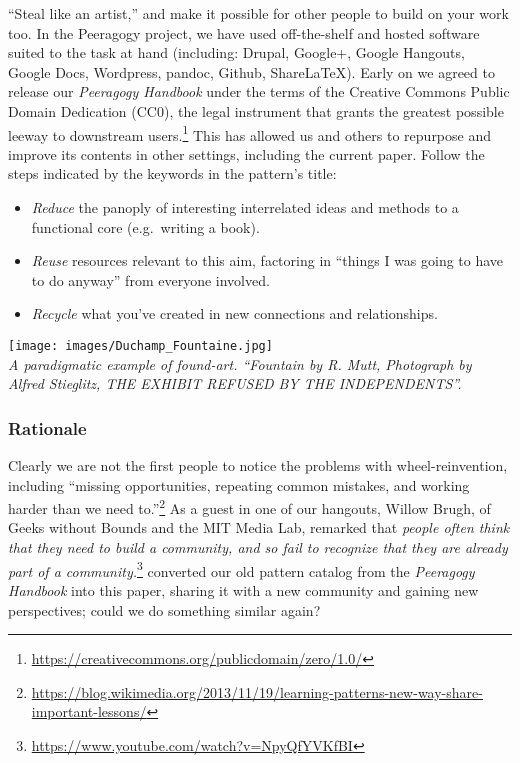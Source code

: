``Steal like an artist,'' and make it possible for other people to build
on your work too. In the Peeragogy project, we have used off-the-shelf
and hosted software suited to the task at hand (including: Drupal,
Google+, Google Hangouts, Google Docs, Wordpress, pandoc, Github,
ShareLaTeX). Early on we agreed to release our \emph{Peeragogy Handbook}
under the terms of the Creative Commons Public Domain Dedication (CC0),
the legal instrument that grants the greatest possible leeway to
downstream users.\footnote{\url{https://creativecommons.org/publicdomain/zero/1.0/}}
This has allowed us and others to repurpose and improve its contents in
other settings, including the current paper. Follow the steps indicated
by the keywords in the pattern's title:

\begin{itemize}
\tightlist
\item
  \emph{Reduce} the panoply of interesting interrelated ideas and
  methods to a functional core (e.g.~writing a book).
\item
  \emph{Reuse} resources relevant to this aim, factoring in ``things I
  was going to have to do anyway'' from everyone involved.
\item
  \emph{Recycle} what you've created in new connections and
  relationships.
\end{itemize}

\texttt{[image: images/Duchamp\_Fountaine.jpg]}\\
\emph{A paradigmatic example of found-art. ``Fountain by R. Mutt,
Photograph by Alfred Stieglitz, THE EXHIBIT REFUSED BY THE
INDEPENDENTS''.}

\hypertarget{rationale}{%
\subsubsection{Rationale}\label{rationale}}

Clearly we are not the first people to notice the problems with
wheel-reinvention, including ``missing opportunities, repeating common
mistakes, and working harder than we need to.''\footnote{\url{https://blog.wikimedia.org/2013/11/19/learning-patterns-new-way-share-important-lessons/}}
As a guest in one of our hangouts, Willow Brugh, of Geeks without Bounds
and the MIT Media Lab, remarked that \emph{people often think that they
need to build a community, and so fail to recognize that they are
already part of a community.}\footnote{\url{https://www.youtube.com/watch?v=NpyQfYVKfBI}}
converted our old pattern catalog from the \emph{Peeragogy Handbook}
into this paper, sharing it with a new community and gaining new
perspectives; could we do something similar again?

